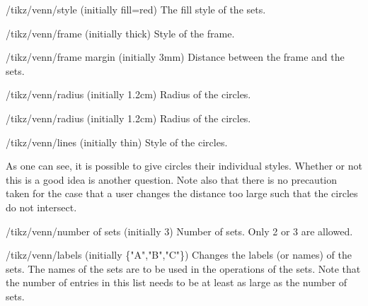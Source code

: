 \documentclass[a4paper]{ltxdoc}
\begin{document}
\begin{key}{/tikz/venn/style (initially {fill=red})}
         The fill style of the sets.
\end{key}
\begin{key}{/tikz/venn/frame (initially {thick})}
         Style of the frame.
\end{key}
\begin{key}{/tikz/venn/frame margin (initially {3mm})}
         Distance between the frame and the sets.
\end{key}
\begin{key}{/tikz/venn/radius (initially {1.2cm})}
         Radius of the circles.
\end{key}
\begin{key}{/tikz/venn/radius (initially {1.2cm})}
         Radius of the circles.
\end{key}
\begin{key}{/tikz/venn/lines (initially {thin})}
         Style of the circles.
\end{key}



\begin{codeexample}[width=5cm]
\end{codeexample}

As one can see, it is possible to give circles their individual styles. Whether
or not this is a good idea is another question. Note also that there is no precaution taken for the case that a user changes the
distance too large such that the circles do not intersect.


\begin{key}{/tikz/venn/number of sets (initially 3)}
        Number of sets. Only 2 or 3 are allowed.
\end{key}


\begin{codeexample}[width=5cm]
\end{codeexample}


\begin{key}{/tikz/venn/labels (initially \{"A","B","C"\})}
		Changes the labels (or names) of the sets. The names of the sets are to
		be used in the operations of the sets. Note that the number of entries
		in this list needs to be at least as large as the number of sets.
\end{key}
\end{document}

